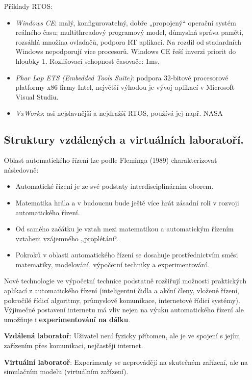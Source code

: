 Příklady RTOS:
\begin{itemize}
\item \textit{Windows CE}: malý, konfigurovatelný, dobře „propojený“ operační systém reálného času; multithreadový programový model, důmyslná správa paměti, rozsáhlá množina ovladačů, podpora RT aplikací. Na rozdíl od stadardních Windows nepodporují více procesorů. Windows CE řeší inverzi priorit do hloubky 1. Rozlišovací schopnost časovače: 1ms.
\item \textit{Phar Lap ETS (Embedded Tools Suite)}: podpora 32-bitové procesorové platformy x86 firmy Intel, největší výhodou je vývoj aplikací v Microsoft Visual Studiu.
\item \textit{VxWorks}: asi nejslavnější a nejdražší RTOS, používá jej např. NASA
\end{itemize}

\subsection{Struktury vzdálených a virtuálních laboratoří.}
Oblast automatického řízení lze podle Fleminga (1989) charakterizovat následovně:
\begin{itemize}
\item Automatické řízení je ze své podstaty interdisciplinárním oborem.
\item Matematika hrála a v budoucnu bude ještě více hrát zásadní roli v rozvoji automatického řízení.
\item Od samého začátku je vztah mezi matematikou a automatickým řízením vztahem vzájemného „proplétání“.
\item Pokroků v oblasti automatického řízení se dosahuje prostřednictvím směsi matematiky, modelování, výpočetní techniky a experimentování.
\end{itemize}
Nové technologie ve výpočetní technice podstatně rozšiřují možnosti praktických aplikací z automatického řízení (inteligentní čidla a akční členy, vložené řízení, pokročilé řídicí algoritmy, průmyslové komunikace, internetové řídicí systémy). Výjimečné postavení internetu má vliv nejen na výuku automatického řízení ale umožňuje i \textbf{experimentování na dálku}.

\textbf{Vzdálená laboratoř}: Uživatel není fyzicky přítomen, ale je ve spojení s jejím zařízením přes komunikaci, nejčastěji internet.

\textbf{Virtuální laboratoř}: Experimenty se neprovádějí na skutečném zařízení, ale na simulačním modelu (virtuálním zařízení).

